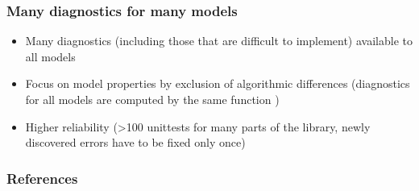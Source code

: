 \documentclass[36pt]{article}
\begin{document}
\begin{tcbposter}
{\begin{multicols}{2}
\subsubsection*{Many diagnostics for many models}
\begin{itemize}
\item
  Many diagnostics (including those that are difficult to implement) available to all models 
\item
  Focus on model properties by exclusion of algorithmic differences
  (diagnostics for all models are computed by the same function )
\item
  Higher reliability (>100 unittests for many parts of the library, newly discovered errors have to be fixed
  only once)

   
\end{itemize}
  
  \subsubsection*{References}
  \nocite{Luo2017Biogeosciences}
  \nocite{Rasmussen2016JMB}
  \nocite{Metzler2018PNAS}
  \tiny{
  
  
  }
\end{multicols}


}

\end{tcbposter}
\end{document}
